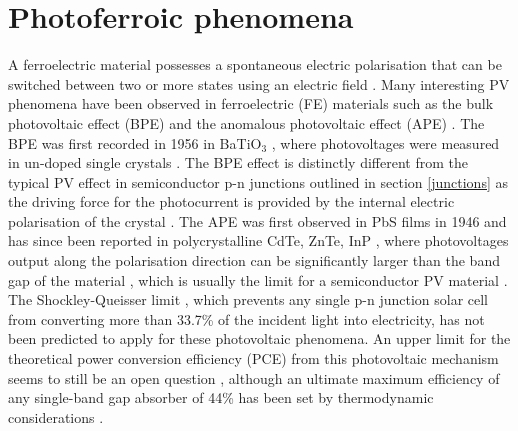\documentclass[11pt, twoside]{report}
\begin{document}
\section{Photoferroic phenomena}\label{ferroPVsection}
A ferroelectric material possesses a spontaneous electric polarisation that can be switched between two or more states using an electric field \cite{new_FE_PV_1}. Many interesting PV phenomena have been observed in ferroelectric (FE) materials such as the bulk photovoltaic effect (BPE) and the anomalous photovoltaic effect (APE) \cite{keith}. 
The BPE was first recorded in 1956 in BaTiO$_3$ \cite{keith_46}, where photovoltages were measured in un-doped single crystals \cite{keith}.
The BPE effect is distinctly different from the typical PV effect in semiconductor
p-n junctions outlined in section \ref{junctions} as the driving force for the photocurrent is provided by the internal electric polarisation of the crystal \cite{FE_PV_rev1}. 
The APE was first observed in PbS films in 1946 \cite{keith_54} and has since been reported in polycrystalline CdTe, ZnTe, InP \cite{keith_55, keith_56, keith_57}, where photovoltages output along the polarisation direction can be significantly larger than the band gap of the material \cite{FE_PV_rev1}, which is usually the limit for a semiconductor PV material \cite{keith}. 
The Shockley-Queisser limit \cite{SQ_1961}, which prevents any single p-n junction solar cell from converting more than 33.7\% of the incident light into electricity, has not been predicted to apply for these photovoltaic phenomena. An upper limit for the theoretical power conversion efficiency (PCE) from this photovoltaic mechanism seems to still be an open question \cite{ FE-PV_kirchartz, new_FE_PV}, although an ultimate maximum efficiency of any single-band gap absorber of 44\% has been set by thermodynamic considerations \cite{SQ_1961}. 
\end{document}
